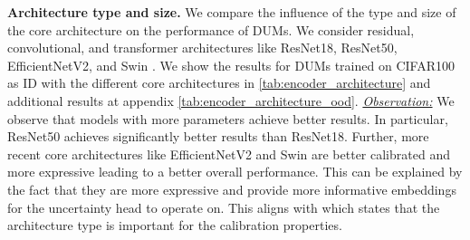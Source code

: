 \textbf{Architecture type and size.} We compare the influence of the type and size of the core architecture on the performance of DUMs. We consider residual, convolutional, and transformer architectures like ResNet18, ResNet50, EfficientNetV2, and Swin \citep{he2016resnet, tan2021effcientnet, liu2021swin}. We show the results for DUMs trained on CIFAR100 as ID with the different core architectures in \cref{tab:encoder_architecture} and additional results at appendix \cref{tab:encoder_architecture_ood}. \underline{\textit{Observation:}} We observe that models with more parameters achieve better results. In particular, ResNet50 achieves significantly better results than ResNet18. Further, more recent core architectures like EfficientNetV2 and Swin are better calibrated and more expressive leading to a better overall performance. This can be explained by the fact that they are more expressive and provide more informative embeddings for the uncertainty head to operate on. This aligns with \citet{minderer2021calibration} which states that the architecture type is important for the calibration properties. 



